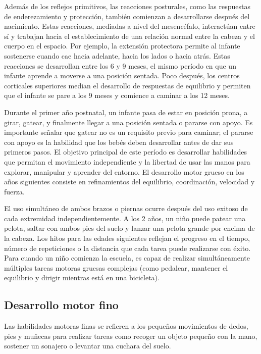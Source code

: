 \documentclass[11pt,letterpaper]{report}
\begin{document}
Además de los reflejos primitivos, las reacciones posturales, como las
respuestas de enderezamiento y protección, también comienzan a desarrollarse
después del nacimiento. Estas reacciones, mediadas a nivel del mesencéfalo,
interactúan entre sí y trabajan hacia el establecimiento de una relación normal
entre la cabeza y el cuerpo en el espacio. Por ejemplo, la extensión
protectora permite al infante sostenerse cuando cae hacia adelante, hacia los
lados o hacia atrás. Estas reacciones se desarrollan entre los 6 y 9 meses, el
mismo período en que un infante aprende a moverse a una posición sentada. Poco
después, los centros corticales superiores median el desarrollo de respuestas
de equilibrio y permiten que el infante se pare a los 9 meses y comience a
caminar a los 12 meses. \cite{Gerber2010}

Durante el primer año postnatal, un infante pasa de estar en posición prona, a
girar, gatear, y finalmente llegar a una posición sentada o pararse con apoyo.
Es importante señalar que gatear no es un requisito previo para caminar; el
pararse con apoyo es la habilidad que los bebés deben desarrollar antes de dar
sus primeros pasos. El objetivo principal de este período es desarrollar
habilidades que permitan el movimiento independiente y la libertad de usar las
manos para explorar, manipular y aprender del entorno. El desarrollo motor
grueso en los años siguientes consiste en refinamientos del equilibrio,
coordinación, velocidad y fuerza. \cite{Gerber2010}

El uso simultáneo de ambos brazos o piernas ocurre después del uso exitoso de
cada extremidad independientemente. A los 2 años, un niño puede patear una
pelota, saltar con ambos pies del suelo y lanzar una pelota grande por encima
de la cabeza. Los hitos para las edades siguientes reflejan el progreso en el
tiempo, número de repeticiones o la distancia que cada tarea puede realizarse
con éxito. Para cuando un niño comienza la escuela, es capaz de realizar
simultáneamente múltiples tareas motoras gruesas complejas (como pedalear,
mantener el equilibrio y dirigir mientras está en una bicicleta).
\cite{Gerber2010}

\subsection{Desarrollo motor fino}
Las habilidades motoras finas se refieren a los pequeños movimientos de dedos,
pies y muñecas para realizar tareas como recoger un objeto pequeño con la mano,
sostener un sonajero o levantar una cuchara del suelo. \cite{Panda2021}
\end{document}
